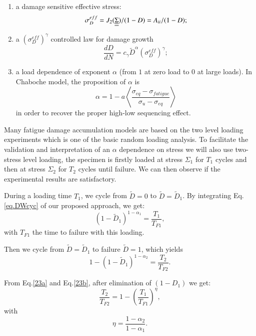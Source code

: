 \documentclass[3p,times,procedia,number]{elsarticle}
\begin{document}
\begin{enumerate} 
\vspace{6pt}
\item a damage sensitive effective stress: 
$$\sigma_D^{eff} = J_2(\uline{\uline{\Sigma}})/(1-D)={A}_{\uppercase\expandafter{\romannumeral2}}/(1-D);$$

\vspace{6pt}

\item a $(\sigma_D^{eff})^\gamma$ controlled  law for damage growth
$$\dfrac{dD}{dN} =c_\gamma {\tilde{D}}^\alpha (\sigma_D^{eff})^\gamma;$$

\vspace{6pt}

\item  a load dependence of exponent $\alpha$ (from $1$ at zero load to $0$ at large loads). In Chaboche model, the proposition of $\alpha$ is
\begin{equation}
\alpha = 1 - a\left\langle \frac{ \sigma_{eq}-\sigma_{fatigue}}{ \sigma_{u} - \sigma_{eq}}\right\rangle
\label{eq.alpchaboche}
\end{equation}
in order to recover the proper high-low sequencing effect.
\end{enumerate}

Many fatigue damage accumulation models are based on the two level loading experiments which is one of the basic random loading analysis. To facilitate the validation and interpretation of an $\alpha$ dependence on stress we will also use two-stress level loading, the specimen is firstly loaded at stress $\Sigma_1$ for $T_1$ cycles and then at stress $\Sigma_2$ for $T_2$ cycles until failure. We can then observe if the experimental results are satisfactory.

During a loading time $T_1$, we  cycle  from $\tilde{D}=0$ to $\tilde{D}= \tilde{D}_1$. By integrating Eq.\eqref{eq.DWcyc} of our proposed approach, we get:
\begin{equation}
\left( 1-\tilde{D}_1\right) ^{1-\alpha_1}=\dfrac{T_1}{T_{F1}},
\label{23a}
\end{equation}
with $T_{F1}$ the time to failure with this loading.

Then we cycle from  ${\tilde D}={\tilde D}_1$ to failure ${\tilde D}=1$, which yields
\begin{equation}
1-\left( 1-\tilde{D}_1\right)^{1-\alpha_2}=\dfrac{T_2}{T_{F2}}.
\label{23b}
\end{equation}

From Eq.\eqref{23a} and Eq.\eqref{23b}, after elimination of $\left( 1-D_1\right)$ we get:
\begin{equation} 
\dfrac{T_2}{T_{F2}} =1-\left( \dfrac{T_1}{T_{F1}}\right) ^\eta,
\label{eq.sequence}
\end{equation}
with
\begin{equation}
\eta=\dfrac{1-\alpha_2}{1-\alpha_1}.
\label{eq.eta}
\end{equation}
\end{document}
